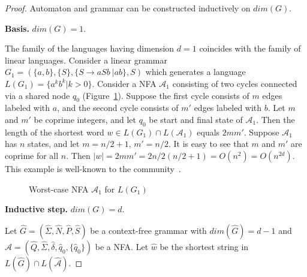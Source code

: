 \documentclass[11pt,a4paper]{article} %
\begin{document}
\begin{proof} Automaton and grammar can be constructed inductively on $dim(G)$.

\textbf{Basis.} $dim(G) = 1$.

The family of the languages having dimension $d = 1$  coincides with the family of linear languages. Consider a linear grammar $G_1=(\{a, b\}, \{S\}, \{S \rightarrow aSb\ |ab\}, S)$ which generates a language $L(G_1) = \{a^kb^k \vert k > 0\}$. 
Consider a NFA $\mathcal{A}_1$ consisting of two cycles connected via a shared node $q_0$ (Figure~\ref{worstd_1}). Suppose the first cycle consists of $m$ edges labeled with $a$, and the second cycle consists of $m'$ edges labeled with $b$. 
Let $m$ and $m'$ be coprime integers, and let $q_0$ be start and final state of $\mathcal{A}_1$. Then the length of the shortest word $w \in L(G_1) \cap L(\mathcal{A}_1)$ equals $2mm'$. Suppose $\mathcal{A}_1$ has $n$ states, and let $m = n/2 + 1$, $m'=n/2$. It is easy to see that $m$ and $m'$ are coprime for all $n$. Then $|w| = 2mm' = 2n/2(n/2 + 1) = O(n^2) = O(n^{2d})$. This example is well-known to the community~\cite{HellingsCFPQ, Yannakakis}. 

\begin{figure}[h]
\centering
  \begin{minipage}[m]{0.4\linewidth}
  \end{minipage}\hfill
\caption{Worst-case NFA $\mathcal{A}_1$ for $L(G_1)$}
\label{worstd_1}
\end{figure}

\textbf{Inductive step.} $dim(G) = d$.

Let $\hat{G} =  (\hat{\Sigma}, \hat{N}, \hat{P}, \hat{S})$ be a context-free grammar with $dim(\hat{G}) = d-1$ and $\hat{\mathcal{A}}= (\hat{Q},\hat{\Sigma},\hat{\delta} ,\hat{q}_{0},\{\hat{q}_{0}\})$  be a NFA. Let $\hat{w}$ be the shortest string in $L(\hat{G}) \cap L(\hat{\mathcal{A}})$.


\end{proof}
\end{document}
